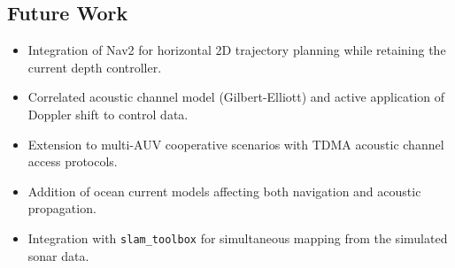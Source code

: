 \documentclass[10pt,twocolumn,letterpaper]{article}
\begin{document}
\subsection{Future Work}

\begin{itemize}[leftmargin=*,itemsep=2pt]
    \item Integration of Nav2 for horizontal 2D trajectory planning while retaining the current depth controller.
    \item Correlated acoustic channel model (Gilbert-Elliott) and active application of Doppler shift to control data.
    \item Extension to multi-AUV cooperative scenarios with TDMA acoustic channel access protocols.
    \item Addition of ocean current models affecting both navigation and acoustic propagation.
    \item Integration with \texttt{slam\_toolbox} for simultaneous mapping from the simulated sonar data.
\end{itemize}
\end{document}
